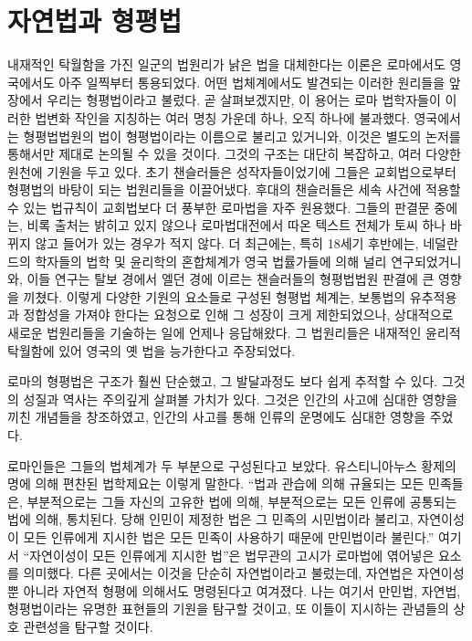 \chapter{자연법과 형평법}

내재적인 탁월함을 가진
일군의 법원리가
낡은 법을 대체한다는 이론은
로마에서도 영국에서도 아주 일찍부터 통용되었다.
어떤 법체계에서도 발견되는
이러한 원리들을 앞 장에서 우리는 형평법이라고 불렀다.
곧 살펴보겠지만, 이 용어는
로마 법학자들이 이러한 법변화 작인을 지칭하는
여러 명칭 가운데 하나, 오직 하나에 불과했다.
영국에서는 형평법법원의 법이
형평법이라는 이름으로 불리고 있거니와,
이것은 별도의 논저를 통해서만 제대로 논의될 수 있을 것이다.
그것의 구조는 대단히 복잡하고, 여러 다양한 원천에 기원을 두고 있다.
초기 챈슬러들은 성작자들이었기에 그들은 교회법으로부터
형평법의 바탕이 되는 법원리들을 이끌어냈다.
후대의 챈슬러들은
세속 사건에 적용할 수 있는 법규칙이 교회법보다 더 풍부한 로마법을
자주 원용했다.
그들의 판결문 중에는, 비록 출처는 밝히고 있지 않으나
로마법대전에서 따온 텍스트 전체가 토씨 하나 바뀌지 않고
들어가 있는 경우가 적지 않다.
더 최근에는, 특히 18세기 후반에는,
네덜란드의 학자들의 법학 및 윤리학의 혼합체계가 영국 법률가들에 의해
널리 연구되었거니와,
이들 연구는
탈보 경에서 엘던 경에 이르는
챈슬러들의 형평법법원 판결에 큰 영향을 끼쳤다.
이렇게 다양한 기원의 요소들로 구성된 형평법 체계는,
보통법의 유추적용과 정합성을 가져야 한다는 요청으로 인해
그 성장이 크게 제한되었으나,
상대적으로 새로운 법원리들을 기술하는 일에 언제나 응답해왔다.
그 법원리들은 내재적인 윤리적 탁월함에 있어 영국의 옛 법을 능가한다고
주장되었다.

로마의 형평법은 구조가 훨씬 단순했고, 그 발달과정도 보다 쉽게 추적할 수 있다.
그것의 성질과 역사는 주의깊게 살펴볼 가치가 있다.
그것은 인간의 사고에 심대한 영향을 끼친 개념들을 창조하였고,
인간의 사고를 통해 인류의 운명에도 심대한 영향을 주었다.

로마인들은 그들의 법체계가 두 부분으로 구성된다고 보았다.
유스티니아누스 황제의 명에 의해 편찬된 법학제요는 이렇게 말한다.
``법과 관습에 의해 규율되는 모든 민족들은, 부분적으로는 그들 자신의
고유한 법에 의해, 부분적으로는 모든 인류에 공통되는 법에 의해,
통치된다. 당해 인민이 제정한 법은 그 민족의 시민법이라
불리고, 자연이성이 모든 인류에게 지시한 법은
모든 민족이 사용하기 때문에
만민법이라 불린다.''
여기서 ``자연이성이 모든 인류에게 지시한 법''은 법무관의 고시가
로마법에 엮어넣은 요소를 의미했다.
다른 곳에서는 이것을 단순히 자연법이라고 불렀는데,
자연법은 자연이성뿐 아니라 자연적 형평에 의해서도
명령된다고 여겨졌다.
나는 여기서 만민법, 자연법, 형평법이라는 유명한 표현들의 기원을 탐구할 것이고,
또 이들이 지시하는 관념들의 상호 관련성을 탐구할 것이다.

